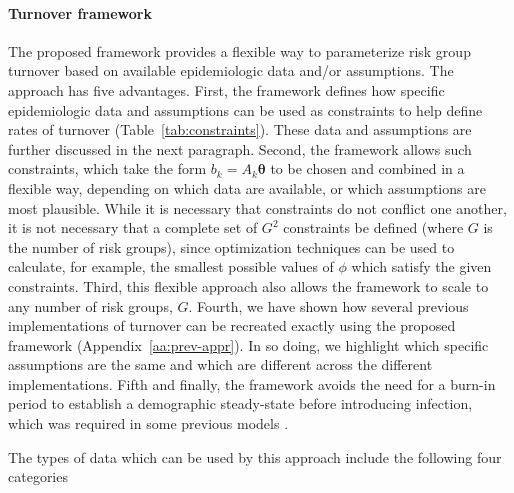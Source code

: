 \paragraph{Turnover framework}
The proposed framework provides a flexible way to parameterize risk group turnover
based on available epidemiologic data and/or assumptions.
The approach has five advantages.
First, the framework defines how specific epidemiologic data and assumptions
can be used as constraints to help define rates of turnover
(Table~\ref{tab:constraints}).
These data and assumptions are further discussed in the next paragraph.
Second, the framework allows such constraints,
which take the form $b_k = A_k \bm{\theta}$
to be chosen and combined in a flexible way,
depending on which data are available, or which assumptions are most plausible.
While it is necessary that constraints do not conflict one another,
it is not necessary that a complete set of $G^2$ constraints be defined
(where $G$ is the number of risk groups),
since optimization techniques can be used to calculate, for example,
the smallest possible values of $\phi$ which satisfy the given constraints.
Third, this flexible approach also allows the framework to scale
to any number of risk groups, $G$.
Fourth, we have shown how several previous implementations of turnover
\citep{Stigum1994,Eaton2014,Henry2015}
can be recreated exactly using the proposed framework
(Appendix~\ref{aa:prev-appr}).
In so doing, we highlight which specific assumptions are
the same and which are different
across the different implementations.
Fifth and finally, the framework avoids the need for a burn-in period
to establish a demographic steady-state before introducing infection,
which was required in some previous models \citep{Boily2015}.
\par
The types of data which can be used by this approach include the following four categories
